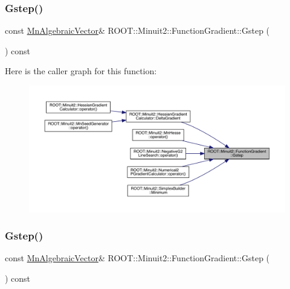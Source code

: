 \subsubsection{\texorpdfstring{Gstep()}{Gstep()}\hspace{0.1cm}{\footnotesize\ttfamily [2/3]}}
{\footnotesize\ttfamily const \mbox{\hyperlink{namespaceROOT_1_1Minuit2_a62ed97730a1ca8d3fbaec64a19aa11c9}{Mn\+Algebraic\+Vector}}\& R\+O\+O\+T\+::\+Minuit2\+::\+Function\+Gradient\+::\+Gstep (\begin{DoxyParamCaption}{ }\end{DoxyParamCaption}) const\hspace{0.3cm}{\ttfamily [inline]}}

Here is the caller graph for this function\+:
\nopagebreak
\begin{figure}[H]
\begin{center}
\leavevmode
\includegraphics[width=350pt]{d3/d48/classROOT_1_1Minuit2_1_1FunctionGradient_a09cf6f34997cef2cffca0d9ccc2b36b8_icgraph}
\end{center}
\end{figure}
\mbox{\label{classROOT_1_1Minuit2_1_1FunctionGradient_a09cf6f34997cef2cffca0d9ccc2b36b8}} 
\subsubsection{\texorpdfstring{Gstep()}{Gstep()}\hspace{0.1cm}{\footnotesize\ttfamily [3/3]}}
{\footnotesize\ttfamily const \mbox{\hyperlink{namespaceROOT_1_1Minuit2_a62ed97730a1ca8d3fbaec64a19aa11c9}{Mn\+Algebraic\+Vector}}\& R\+O\+O\+T\+::\+Minuit2\+::\+Function\+Gradient\+::\+Gstep (\begin{DoxyParamCaption}{ }\end{DoxyParamCaption}) const\hspace{0.3cm}{\ttfamily [inline]}}

